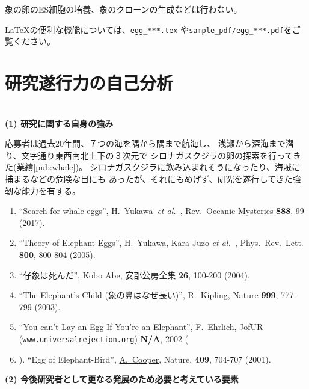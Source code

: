 \documentclass[11pt,a4j,dvipdfmx]{jarticle} 					%
\newcommand{\研究課題名}{象の卵}
\newcommand{\研究機関名}{逢坂大学}
\newcommand{\研究代表者氏名}{湯川秀樹}
\newcommand{\paper}[6]{%
	\item ``#1'', #2, #3 {\bf #4}, #5 (#6).			%
}
\newcommand{\etal}{\textit{et al.\ }}
\newcommand{\yukawa}{H.~Yukawa}					%
\newcommand{\prl}{Phys.\ Rev.\ Lett.\ }		%
\begin{document}
	象の卵のES細胞の培養、象のクローンの生成などは行わない。

	\LaTeX の便利な機能については、\texttt{egg\_***.tex} や\texttt{sample\_pdf/egg\_***.pdf}をご覧ください。




\section{研究遂行力の自己分析}

\DCPDInstructionsA\\%
\noindent
\textbf{(1) 研究に関する自身の強み}
\DCPDInstructionsB%

	応募者は過去20年間、７つの海を隅から隅まで航海し、
	浅瀬から深海まで潜り、文字通り東西南北上下の３次元で
	シロナガスクジラの卵の探索を行ってきた(業績\ref{pub:whale})。
	シロナガスクジラに飲み込まれそうになったり、海賊に捕まるなどの危険な目にも
	あったが、それにもめげず、研究を遂行してきた強靭な能力を有する。
	\begin{enumerate}
		\paper{Search for whale eggs}{\yukawa\ \etal}{Rev.\ Oceanic Mysteries}{888}{99}{2017}
			\label{pub:whale}
				
		\paper{Theory of Elephant Eggs}{\yukawa, Kara Juzo \etal}{\prl}{800}{800-804}{2005}
			\label{pub:theoegg}
				
		\paper{仔象は死んだ}{Kobo Abe}{安部公房全集}{26}{100-200}{2004}
		
		\paper{The Elephant's Child (象の鼻はなぜ長い)}{R.~Kipling}{Nature}{999}{777-799}{2003}

		\paper{You can't Lay an Egg If You're an Elephant}{F.~Ehrlich}
			{JofUR\\({\tt www.universalrejection.org})}{{\bf N/A}}{2002}
		
		\item ``Egg of Elephant-Bird'', 
				\underline{A.~Cooper},
				Nature, {\bf 409}, 704-707 (2001).	%
	\end{enumerate}
\vspace{5mm}
\noindent
\textbf{(2) 今後研究者として更なる発展のため必要と考えている要素}
\end{document}

